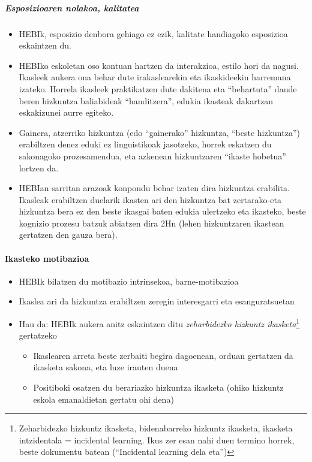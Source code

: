 \documentclass[
]{book}
\providecommand{\tightlist}{%
  \setlength{\itemsep}{0pt}\setlength{\parskip}{0pt}}
\begin{document}
\hypertarget{esposizioaren-nolakoa-kalitatea}{%
\subparagraph{Esposizioaren nolakoa, kalitatea}\label{esposizioaren-nolakoa-kalitatea}}

\begin{itemize}
\tightlist
\item
  HEBIk, esposizio denbora gehiago ez ezik, kalitate handiagoko esposizioa eskaintzen du.
\item
  HEBIko eskoletan oso kontuan hartzen da interakzioa, estilo hori da nagusi. Ikasleek aukera ona behar dute irakaslearekin eta ikaskideekin harremana izateko. Horrela ikasleek praktikatzen dute dakitena eta ``behartuta'' daude beren hizkuntza baliabideak ``handitzera'', edukia ikasteak dakartzan eskakizunei aurre egiteko.
\item
  Gainera, atzerriko hizkuntza (edo ``gainerako'' hizkuntza, ``beste hizkuntza'') erabiltzen denez eduki ez linguistikoak jasotzeko, horrek eskatzen du sakonagoko prozesamendua, eta azkenean hizkuntzaren ``ikaste hobetua'' lortzen da.
\item
  HEBIan sarritan arazoak konpondu behar izaten dira hizkuntza erabilita. Ikasleak erabiltzen duelarik ikasten ari den hizkuntza bat zertarako-eta hizkuntza bera ez den beste ikasgai baten edukia ulertzeko eta ikasteko, beste kognizio prozesu batzuk abiatzen dira 2Hn (lehen hizkuntzaren ikastean gertatzen den gauza bera).
\end{itemize}

\hypertarget{ikasteko-motibazioa}{%
\paragraph{Ikasteko motibazioa}\label{ikasteko-motibazioa}}

\begin{itemize}
\tightlist
\item
  HEBIk bilatzen du motibazio intrinsekoa, barne-motibazioa
\item
  Ikaslea ari da hizkuntza erabiltzen zeregin interesgarri eta esanguratsuetan
\item
  Hau da: HEBIk aukera anitz eskaintzen ditu \emph{zeharbidezko hizkuntz ikasketa}\footnote{Zeharbidezko hizkuntz ikasketa, bidenabarreko hizkuntz ikasketa, ikasketa intzidentala = incidental learning. Ikus zer esan nahi duen termino horrek, beste dokumentu batean (``Incidental learning dela eta'')} gertatzeko

  \begin{itemize}
  \tightlist
  \item
    Ikaslearen arreta beste zerbaiti begira dagoenean, orduan gertatzen da ikasketa sakona, eta luze irauten duena
  \item
    Positiboki osatzen du berariazko hizkuntza ikasketa (ohiko hizkuntz eskola emanaldietan gertatu ohi dena)
  \end{itemize}
\end{itemize}
\end{document}
